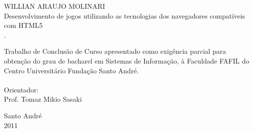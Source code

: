 \thispagestyle{empty}

\vspace{3cm}
\begin{center}
WILLIAN ARAUJO MOLINARI \\
\vspace{3cm}
\huge Desenvolvimento de jogos utilizando as tecnologias dos navegadores compatíveis com HTML5 \\
\vspace{2.5cm}
\large.\\
\hspace{6cm} \begin{minipage}{0.5\textwidth}
Trabalho de Conclusão de Curso apresentado como exigência parcial para
obtenção do grau de bacharel em Sistemas de Informação, à Faculdade
FAFIL do Centro Universitário Fundação Santo André. \\
\\
Orientador: \\
Prof. Tomaz Mikio Sasaki
\end{minipage}
\vspace{5cm}

\large Santo André \\ 2011
\end{center}
